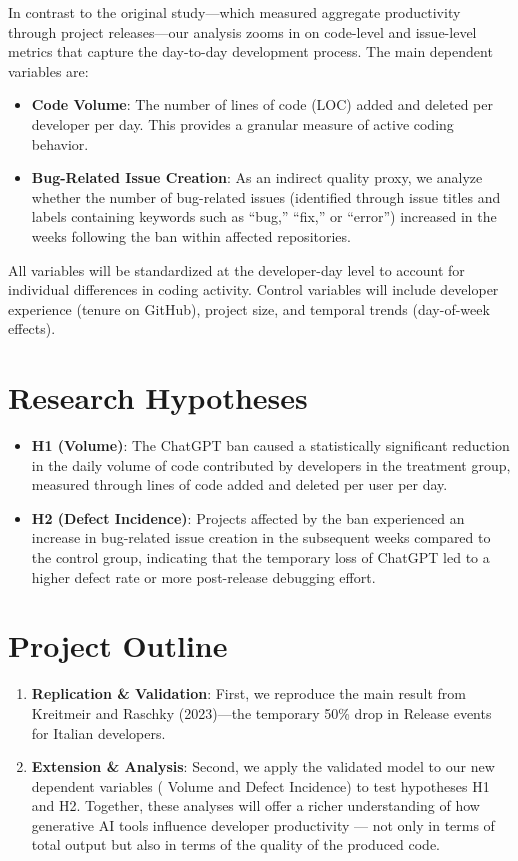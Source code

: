 In contrast to the original study—which measured aggregate productivity through project releases—our analysis zooms in on code-level and issue-level metrics that capture the day-to-day development process. The main dependent variables are:

\begin{itemize}
  \item \textbf{Code Volume}: The number of lines of code (LOC) added and deleted per developer per day. This provides a granular measure of active coding behavior.
  \item \textbf{Bug-Related Issue Creation}: As an indirect quality proxy, we analyze whether the number of bug-related issues (identified through issue titles and labels containing keywords such as “bug,” “fix,” or “error”) increased in the weeks following the ban within affected repositories.
\end{itemize}

All variables will be standardized at the developer-day level to account for individual differences in coding activity. Control variables will include developer experience (tenure on GitHub), project size, and temporal trends (day-of-week effects).


\section*{Research Hypotheses}

\begin{itemize}
  \item \textbf{H1 (Volume)}: The ChatGPT ban caused a statistically significant reduction in the daily volume of code contributed by developers in the treatment group, measured through lines of code added and deleted per user per day.
  \item \textbf{H2 (Defect Incidence)}: Projects affected by the ban experienced an increase in bug-related issue creation in the subsequent weeks compared to the control group, indicating that the temporary loss of ChatGPT led to a higher defect rate or more post-release debugging effort.
\end{itemize}


\section*{Project Outline}

\begin{enumerate}
  \item \textbf{Replication \& Validation}: First, we reproduce the main result from Kreitmeir and Raschky (2023)—the temporary 50\% drop in Release events for Italian developers.
  \item \textbf{Extension \& Analysis}: Second, we apply the validated model to our new dependent variables ( Volume and Defect Incidence) to test hypotheses H1 and H2. Together, these analyses will offer a richer understanding of how generative AI tools influence developer productivity — not only in terms of total output but also in terms of the quality of the produced code.
\end{enumerate}
